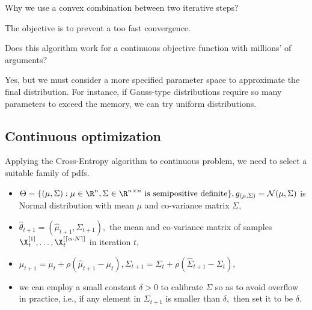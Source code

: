 \begin{ques}
      Why we use a convex combination between two iterative steps?
\end{ques}
\begin{answ}
      The objective is to prevent a too fast convergence.
\end{answ}

\begin{ques}
      Does this algorithm work for a continuous objective function with millions' of arguments?
\end{ques}
\begin{answ}
      Yes, but we must consider a more specified parameter space to approximate the final distribution.
      For instance, if Gauss-type distributions require so many parameters to exceed the memory, 
      we can try uniform distributions.
\end{answ}

    \subsection[continuous]{Continuous optimization}

    		Applying the Cross-Entropy algorithm to continuous problem, we
    		need to select a suitable family of pdfs.\\[1ex]
    		\begin{itemize}
    			\item $\Theta=\{(\mu, \Sigma): \mu\in \R^n, \Sigma\in \R^{n\times n} \text{ is semipositive definite}\}, g_{(\mu,\Sigma)}=\mathcal{N}(\mu, \Sigma)$ is Normal distribution with mean $\mu$ and co-variance matrix $\Sigma,$
    			\item $\hat{\theta}_{t\!+\!1}=(\hat{\mu}_{t\!+\!1}, \hat{\Sigma}_{t\!+\!1}),$ 
    			the mean and co-variance matrix of  samples $\X_t^{[1]}, \ldots, \X_t^{[\lceil \alpha \cdot N \rceil]}$ in iteration $t,$
    			\item $\mu_{t+1}=\mu_t + \rho (\hat{\mu}_{t\!+\!1}-\mu_t), \Sigma_{t\!+\!1}=\Sigma_t+\rho(\hat{\Sigma}_{t\!+\!1}-\Sigma_t),$
    			\item we can employ a small constant $\delta>0$ to calibrate $\Sigma$ so as to avoid
    			overflow in practice, i.e., if any element in $\Sigma_{t\!+\!1}$ is smaller than 
    			$\delta,$ then set it to be $\delta.$
    			
    		\end{itemize}

